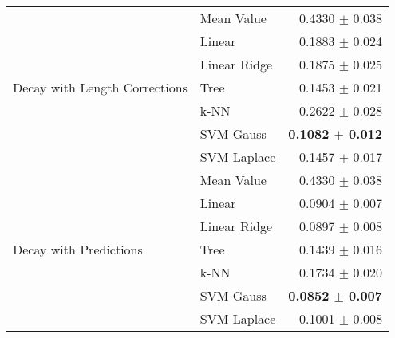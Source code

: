 \documentclass[10pt]{article}
\begin{document}
\begin{table}[H]
\begin{tabular}{llr}
    \hline
    \multirow{7}{*}{Decay with Length Corrections} & Mean Value   & 0.4330 $\pm$ 0.038 \\
                               & Linear       & 0.1883 $\pm$ 0.024 \\
                               & Linear Ridge & 0.1875 $\pm$ 0.025 \\
                               & Tree         & 0.1453 $\pm$ 0.021 \\
                               & k-NN         & 0.2622 $\pm$ 0.028 \\
                               & SVM Gauss    & \textbf{0.1082 $\pm$ 0.012} \\
                               & SVM Laplace  & 0.1457 $\pm$ 0.017 \\
    \hline
    \multirow{7}{*}{Decay with Predictions} & Mean Value   & 0.4330 $\pm$ 0.038 \\
                               & Linear       & 0.0904 $\pm$ 0.007 \\
                               & Linear Ridge & 0.0897 $\pm$ 0.008 \\
                               & Tree         & 0.1439 $\pm$ 0.016 \\
                               & k-NN         & 0.1734 $\pm$ 0.020 \\
                               & SVM Gauss    & \textbf{0.0852 $\pm$ 0.007} \\
                               & SVM Laplace  & 0.1001 $\pm$ 0.008 \\
    \hline\hline
  \end{tabular}
  \label{tab:homoresults}
\end{table}



\end{document}
